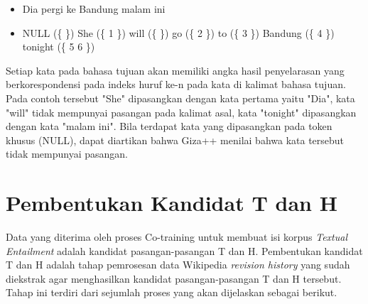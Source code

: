 \begin{itemize}
	\item Dia pergi ke Bandung malam ini
	\item NULL (\{ \}) She (\{ 1 \}) will (\{ \}) go (\{ 2 \}) to (\{ 3 \}) Bandung (\{ 4 \}) tonight (\{ 5 6 \})
\end{itemize}

Setiap kata pada bahasa tujuan akan memiliki angka hasil penyelarasan yang berkorespondensi pada indeks huruf ke-n pada kata di kalimat bahasa tujuan. Pada contoh tersebut "She" dipasangkan dengan kata pertama yaitu "Dia", kata "will" tidak mempunyai pasangan pada kalimat asal, kata "tonight" dipasangkan dengan kata "malam ini". Bila terdapat kata yang dipasangkan pada token khusus (NULL), dapat diartikan bahwa Giza++ menilai bahwa kata tersebut tidak mempunyai pasangan.

\section{Pembentukan Kandidat T dan H} \label{sec:pembentukanTdanH}
Data yang diterima oleh proses Co-training untuk membuat isi korpus \textit{Textual Entailment} adalah kandidat pasangan-pasangan T dan H. Pembentukan kandidat T dan H adalah tahap pemrosesan data Wikipedia \textit{revision history} yang sudah diekstrak agar menghasilkan kandidat pasangan-pasangan T dan H tersebut. Tahap ini terdiri dari sejumlah proses yang akan dijelaskan sebagai berikut.

